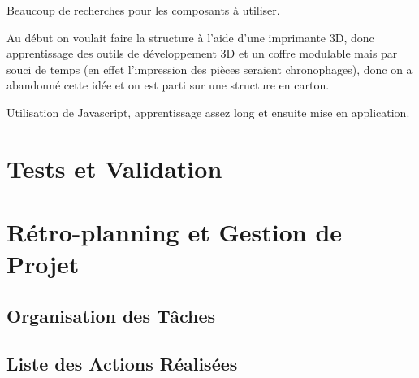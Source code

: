 \documentclass[a4paper,12pt]{report}  %
\begin{document}
	Beaucoup de recherches pour les composants à utiliser.

	Au début on voulait faire la structure à l'aide d'une imprimante 3D, donc 
	apprentissage des outils de développement 3D et un coffre modulable mais 
	par souci de temps (en effet l'impression des pièces seraient chronophages), 
	donc on a abandonné cette idée et on est parti sur une structure en carton.

	Utilisation de Javascript, apprentissage assez long et ensuite mise en application.
	
	\section{Tests et Validation}
	
	\section{Rétro-planning et Gestion de Projet}
	\subsection{Organisation des Tâches}
	
	\subsection{Liste des Actions Réalisées}
\end{document}
